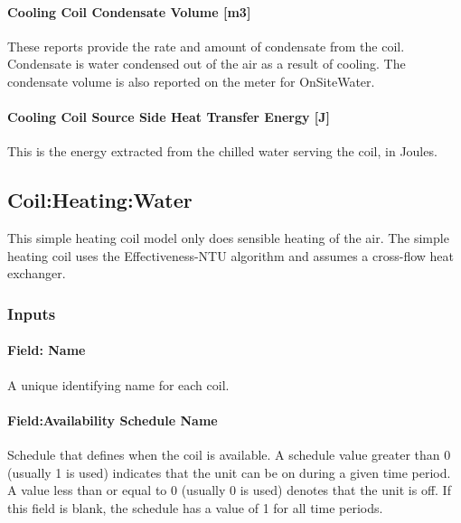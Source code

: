 \paragraph{Cooling Coil Condensate Volume {[}m3{]}}\label{cooling-coil-condensate-volume-m3}

These reports provide the rate and amount of condensate from the coil. Condensate is water condensed out of the air as a result of cooling. The condensate volume is also reported on the meter for OnSiteWater.

\paragraph{Cooling Coil Source Side Heat Transfer Energy {[}J{]}}\label{cooling-coil-source-side-heat-transfer-energy-j}

This is the energy extracted from the chilled water serving the coil, in Joules.

\subsection{Coil:Heating:Water}\label{coilheatingwater}

This simple heating coil model only does sensible heating of the air. The simple heating coil uses the Effectiveness-NTU algorithm and assumes a cross-flow heat exchanger.

\subsubsection{Inputs}\label{inputs-1-020}

\paragraph{Field: Name}\label{field-name-1-019}

A unique identifying name for each coil.

\paragraph{Field:Availability Schedule Name}\label{fieldavailability-schedule-name-1-000}

Schedule that defines when the coil is available. A schedule value greater than 0 (usually 1 is used) indicates that the unit can be on during a given time period. A value less than or equal to 0 (usually 0 is used) denotes that the unit is off. If this field is blank, the schedule has a value of 1 for all time periods.

